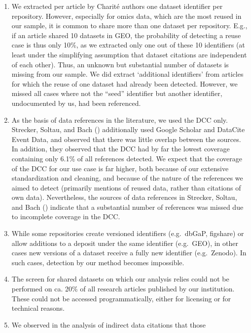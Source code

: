 \documentclass[
  letterpaper,
  DIV=11,
  numbers=noendperiod]{scrartcl}
\begin{document}
\begin{enumerate}
\def\labelenumi{(\arabic{enumi})}
\item
  We extracted per article by Charité authors one dataset identifier per
  repository. However, especially for omics data, which are the most
  reused in our sample, it is common to share more than one dataset per
  repository. E.g., if an article shared 10 datasets in GEO, the
  probability of detecting a reuse case is thus only 10\%, as we
  extracted only one out of these 10 identifiers (at least under the
  simplifying assumption that dataset citations are independent of each
  other). Thus, an unknown but substantial number of datasets is missing
  from our sample. We did extract `additional identifiers' from articles
  for which the reuse of one dataset had already been detected. However,
  we missed all cases where not the ``seed'' identifier but another
  identifier, undocumented by us, had been referenced.
\item
  As the basis of data references in the literature, we used the DCC
  only. Strecker, Soltau, and Bach ()
  additionally used Google Scholar and DataCite Event Data, and observed
  that there was little overlap between the sources. In addition, they
  observed that the DCC had by far the lowest coverage containing only
  6.1\% of all references detected. We expect that the coverage of the
  DCC for our use case is far higher, both because of our extensive
  standardization and cleaning, and because of the nature of the
  references we aimed to detect (primarily mentions of reused data,
  rather than citations of own data). Nevertheless, the sources of data
  references in Strecker, Soltau, and Bach
  () indicate that a substantial number
  of references was missed due to incomplete coverage in the DCC.
\item
  While some repositories create versioned identifiers (e.g.~dbGaP,
  figshare) or allow additions to a deposit under the same identifier
  (e.g.~GEO), in other cases new versions of a dataset receive a fully
  new identifier (e.g.~Zenodo). In such cases, detection by our method
  becomes impossible.
\item
  The screen for shared datasets on which our analysis relies could not
  be performed on ca. 20\% of all research articles published by our
  institution. These could not be accessed programmatically, either for
  licensing or for technical reasons.
\item
  We observed in the analysis of indirect data citations that those

\end{enumerate}
\end{document}
